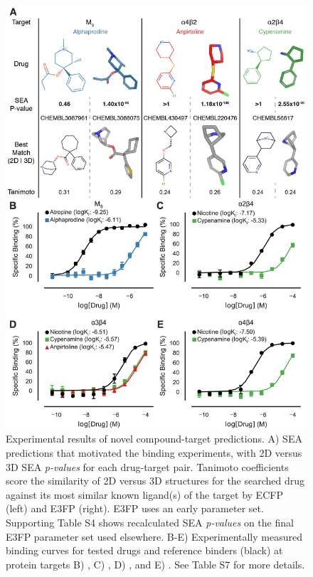 \documentclass[../main.tex]{subfiles}
\begin{document}
\begin{refsection}
\begin{figure}%
    \centering  \includegraphics[width=12.5cm]{figures/chapter2/fig4.png}
    \caption[Experimental results of novel compound-target predictions]{
        Experimental results of novel compound-target predictions.
        A) SEA predictions that motivated the binding experiments, with 2D versus 3D SEA \emph{p-values} for each drug-target pair.
        Tanimoto coefficients score the similarity of 2D versus 3D structures for the searched drug against its most similar known ligand(s) of the target by ECFP (left) and E3FP (right).
        E3FP uses an early parameter set.
        Supporting Table S4 shows recalculated SEA \emph{p-values} on the final E3FP parameter set used elsewhere.
        B-E) Experimentally measured binding curves for tested drugs and reference binders (black) at protein targets B) , C) , D) , and E) .
        See Table S7 for more details.}
    \label{fig:fig4}
\end{figure}


\end{refsection}
\end{document}

